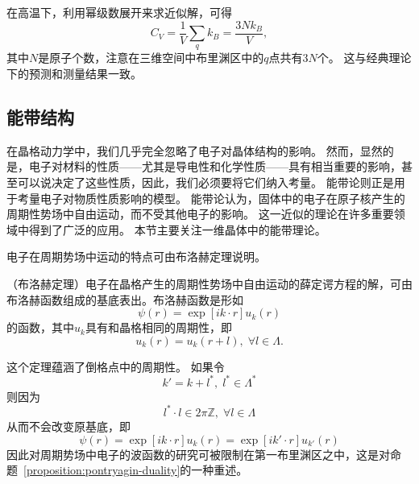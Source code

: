 在高温下，利用幂级数展开来求近似解，可得
\begin{equation}
    C_V = \frac{1}{V} \sum_q k_B = \frac{3 N k_B}{V},
\end{equation}
其中$N$是原子个数，注意在三维空间中布里渊区中的$q$点共有$3N$个。
这与经典理论下的预测和测量结果一致。

\subsection{能带结构}
在晶格动力学中，我们几乎完全忽略了电子对晶体结构的影响。
然而，显然的是，电子对材料的性质——尤其是导电性和化学性质——具有相当重要的影响，甚至可以说决定了这些性质，因此，我们必须要将它们纳入考量。
能带论则正是用于考量电子对物质性质影响的模型。
能带论认为，固体中的电子在原子核产生的周期性势场中自由运动，而不受其他电子的影响。
这一近似的理论在许多重要领域中得到了广泛的应用。
本节主要关注一维晶体中的能带理论。

电子在周期势场中运动的特点可由布洛赫定理说明。
\begin{theorem}
    （布洛赫定理）电子在晶格产生的周期性势场中自由运动的薛定谔方程的解，可由布洛赫函数组成的基底表出。布洛赫函数是形如
    \begin{equation}
        \psi(r) = \exp[i k \cdot r] u_k(r)
    \end{equation}
    的函数，其中$u_k$具有和晶格相同的周期性，即
    \begin{equation}
        u_k(r) = u_k(r + l), \; \forall l \in \Lambda.
    \end{equation}
\end{theorem}

这个定理蕴涵了倒格点中的周期性。
如果令
\begin{equation}
    k' = k + l^*, \; l^* \in \Lambda^*
\end{equation}
则因为
\begin{equation}
    l^* \cdot l \in 2 \pi \mathbb Z, \; \forall l \in \Lambda
\end{equation}
从而不会改变原基底，即
\begin{equation}
    \psi(r) = \exp[i k \cdot r] u_k(r) = \exp[i k' \cdot r] u_{k'}(r)
\end{equation}
因此对周期势场中电子的波函数的研究可被限制在第一布里渊区之中，这是对命题~\ref{proposition:pontryagin-duality}的一种重述。
